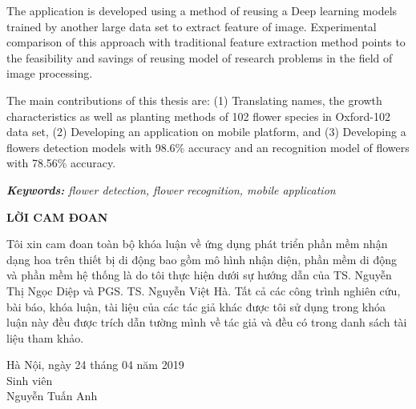 \documentclass[12pt]{report}
\begin{document}
		The application is developed using a method of reusing a Deep learning models trained by another large data set to extract feature of image. Experimental comparison of this approach with traditional feature extraction method points to the feasibility and savings of reusing model of research problems in the field of image processing.
																																																																						
		The main contributions of this thesis are: (1) Translating names, the growth characteristics as well as planting methods of 102 flower species in Oxford-102 data set, (2) Developing an application on mobile platform, and (3) Developing a flowers detection models with 98.6\% accuracy and an recognition model of flowers with 78.56\% accuracy.
																																																																						
																																																																						
		\noindent \textit{\textbf{Keywords:} flower detection, flower recognition, mobile application}
																																																																						
		\newpage
		\begin{center}
			\textbf{\large LỜI CAM ĐOAN}
		\end{center}
		Tôi xin cam đoan toàn bộ khóa luận về ứng dụng phát triển phần mềm nhận dạng hoa trên thiết bị di động bao gồm mô hình nhận diện, phần mềm di động và phần mềm hệ thống là do tôi thực hiện dưới sự hướng dẫn của TS. Nguyễn Thị Ngọc Diệp và PGS. TS. Nguyễn Việt Hà. Tất cả các công trình nghiên cứu, bài báo, khóa luận, tài liệu của các tác giả khác được tôi sử dụng trong khóa luận này đều được trích dẫn tường mình về tác giả và đều có trong danh sách tài liệu tham khảo.
																																																																						
		\begin{flushright}
			\begin{varwidth}{\linewidth}\centering
				Hà Nội, ngày 24 tháng 04 năm 2019\\
				Sinh viên\\[2cm]
				Nguyễn Tuấn Anh
			\end{varwidth}
		\end{flushright}
																																																																						
		\newpage
		\tableofcontents
																																																																						
\end{document}
